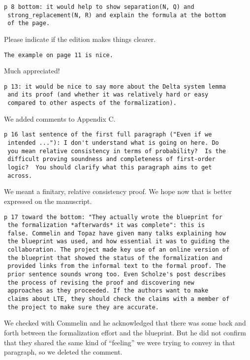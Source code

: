 \documentclass[runningheads]{llncs}
\begin{document}
\begin{verbatim}
p 8 bottom: it would help to show separation(N, Q) and
 strong_replacement(N, R) and explain the formula at the bottom
 of the page.
\end{verbatim}

Please indicate if the edition makes things clearer.

\begin{verbatim}
The example on page 11 is nice.
\end{verbatim}

Much appreciated!

\begin{verbatim}
p 13: it would be nice to say more about the Delta system lemma
 and its proof (and whether it was relatively hard or easy
 compared to other aspects of the formalization).
\end{verbatim}

We added comments to Appendix C.

\begin{verbatim}
p 16 last sentence of the first full paragraph ("Even if we
 intended ..."): I don't understand what is going on here. Do
 you mean relative consistency in terms of probability?  Is the
 difficult proving soundness and completeness of first-order
 logic?  You should clarify what this paragraph aims to get
 across.
\end{verbatim}

We meant a finitary, relative consistency proof. We hope now
that is better expressed on the manuscript.

\begin{verbatim}
p 17 toward the bottom: "They actually wrote the blueprint for
 the formalization *afterwards* it was complete": this is
 false. Commelin and Topaz have given many talks explaining how
 the blueprint was used, and how essential it was to guiding the
 collaboration. The project made key use of an online version of
 the blueprint that showed the status of the formalization and
 provided links from the informal text to the formal proof. The
 prior sentence sounds wrong too. Even Scholze's post describes
 the process of revising the proof and discovering new
 approaches as they proceeded. If the authors want to make
 claims about LTE, they should check the claims with a member of
 the project to make sure they are accurate.
\end{verbatim}

We checked with Commelin and he acknowledged that there was some
back and forth between the formalization effort and the
blueprint. But he did not confirm that they shared the same kind of
“feeling” we were trying to convey in that paragraph, so we deleted
the comment. 
\end{document}
